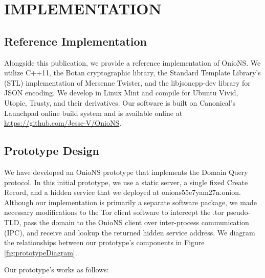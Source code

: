 
\chapter{IMPLEMENTATION}

\section{Reference Implementation}

Alongside this publication, we provide a reference implementation of OnioNS. We utilize C++11, the Botan cryptographic library, the Standard Template Library's (STL) implementation of Mersenne Twister, and the libjsoncpp-dev library for JSON encoding. We develop in Linux Mint and compile for Ubuntu Vivid, Utopic, Trusty, and their derivatives. Our software is built on Canonical's Launchpad online build system and is available online at \url{https://github.com/Jesse-V/OnioNS}. 

\section{Prototype Design}

We have developed an OnioNS prototype that implements the Domain Query protocol. In this initial prototype, we use a static server, a single fixed Create Record, and a hidden service that we deployed at onions55e7yam27n.onion. Although our implementation is primarily a separate software package, we made necessary modifications to the Tor client software to intercept the .tor pseudo-TLD, pass the domain to the OnioNS client over inter-process communication (IPC), and receive and lookup the returned hidden service address. We diagram the relationships between our prototype's components in Figure \ref{fig:prototypeDiagram}.

Our prototype's works as follows:

